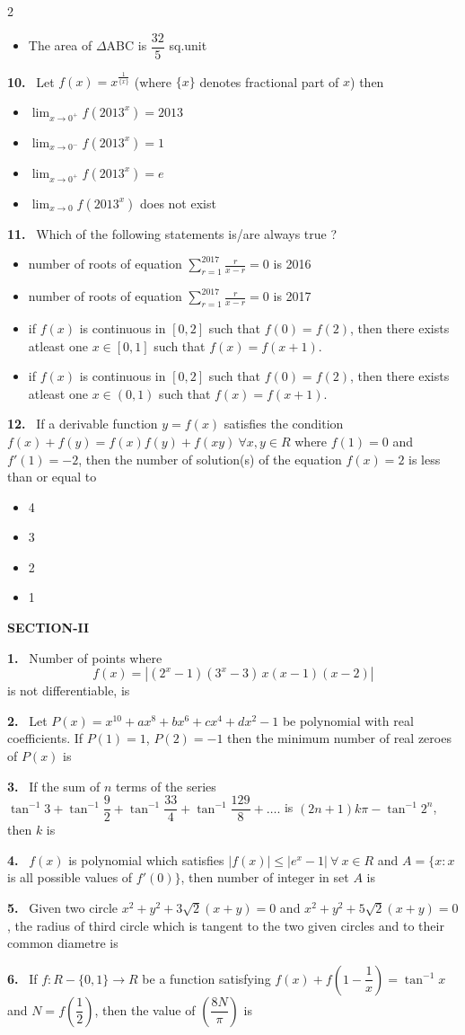 \documentclass[10pt]{extarticle}
\newcommand{\sect}[1]{\par\smallskip\noindent\textbf{#1}\par}
\newcommand{\qn}[1]{\par\smallskip\noindent\textbf{#1.}~}
\newenvironment{qoptions}{\begin{itemize}[leftmargin=1.8em,itemsep=1pt,topsep=2pt,label={}]}{\end{itemize}}
\newcommand{\opt}[2]{\item[(#1)] #2}
\begin{document}
\begin{multicols}{2}
\begin{qoptions}
\opt{D}{The area of $\Delta$ABC is $\dfrac{32}{5}$ sq.unit}
\end{qoptions}
\qn{10} Let $f(x)=x^{\frac{1}{\{x\}}}$ (where $\{x\}$ denotes fractional part of $x$) then
\begin{qoptions}
\opt{A}{$\displaystyle\lim_{x\to0^+}f(2013^x)=2013$}
\opt{B}{$\displaystyle\lim_{x\to0^-}f(2013^x)=1$}
\opt{C}{$\displaystyle\lim_{x\to0^+}f(2013^x)=e$}
\opt{D}{$\displaystyle\lim_{x\to0}f(2013^x)$ does not exist}
\end{qoptions}
\qn{11} Which of the following statements is/are always true ?
\begin{qoptions}
\opt{A}{number of roots of equation $\displaystyle\sum_{r=1}^{2017}\frac{r}{x-r}=0$ is 2016}
\opt{B}{number of roots of equation $\displaystyle\sum_{r=1}^{2017}\frac{r}{x-r}=0$ is 2017}
\opt{C}{if $f(x)$ is continuous in $[0,2]$ such that $f(0)=f(2)$, then there exists atleast one $x\in[0,1]$ such that $f(x)=f(x+1)$.}
\opt{D}{if $f(x)$ is continuous in $[0,2]$ such that $f(0)=f(2)$, then there exists atleast one $x\in(0,1)$ such that $f(x)=f(x+1)$.}
\end{qoptions}
\qn{12} If a derivable function $y=f(x)$ satisfies the condition $f(x)+f(y)=f(x)f(y)+f(xy)\ \forall x,y\in R$ where $f(1)=0$ and $f'(1)=-2$, then the number of solution(s) of the equation $f(x)=2$ is less than or equal to
\begin{qoptions}
\opt{A}{4}
\opt{B}{3}
\opt{C}{2}
\opt{D}{1}
\end{qoptions}
\sect{SECTION-II}
\qn{1} Number of points where \[ f(x)=\left|(2^x-1)(3^x-3)\,x(x-1)(x-2)\right| \] is not differentiable, is
\qn{2} Let $P(x)=x^{10}+ax^8+bx^6+cx^4+dx^2-1$ be polynomial with real coefficients. If $P(1)=1$, $P(2)=-1$ then the minimum number of real zeroes of $P(x)$ is
\qn{3} If the sum of $n$ terms of the series $\tan^{-1}3+\tan^{-1}\dfrac92+\tan^{-1}\dfrac{33}{4}+\tan^{-1}\dfrac{129}{8}+\ldots.$ is $(2n+1)k\pi-\tan^{-1}2^n$, then $k$ is
\qn{4} $f(x)$ is polynomial which satisfies $|f(x)|\le|e^x-1|\ \forall\ x\in R$ and $A=\{x:x$ is all possible values of $f'(0)\}$, then number of integer in set $A$ is
\qn{5} Given two circle $x^2+y^2+3\sqrt2(x+y)=0$ and $x^2+y^2+5\sqrt2(x+y)=0$, the radius of third circle which is tangent to the two given circles and to their common diametre is
\qn{6} If $f:R-\{0,1\}\to R$ be a function satisfying $f(x)+f\left(1-\dfrac1x\right)=\tan^{-1}x$ and $N=f\left(\dfrac12\right)$, then the value of $\left(\dfrac{8N}{\pi}\right)$ is
\end{multicols}
\end{document}
